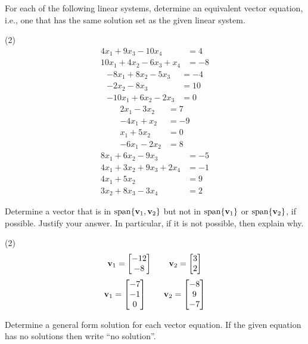 For each of the following linear systems, determine an equivalent
vector equation, i.e., one that has the same solution set as the given
linear system.
\begin{tasks}[resume, style=enumerate](2)
\task
  \begin{align*}4 x_{1} + 9 x_{3} - 10 x_{4} &= 4 \\10 x_{1} + 4 x_{2} - 6 x_{3} + x_{4} &= -8\end{align*}
\task
  \begin{align*}- 8 x_{1} + 8 x_{2} - 5 x_{3} &= -4 \\- 2 x_{2} - 8 x_{3} &= 10 \\- 10 x_{1} + 6 x_{2} - 2 x_{3} &= 0\end{align*}
\task
  \begin{align*}
    2x_{1} - 3x_{2} &= 7 \\
    -4x_{1} + x_{2} &= -9 \\
    x_{1} + 5x_{2} &= 0 \\
    -6x_{1} - 2x_{2} &= 8
  \end{align*}
\task
  \begin{align*}
    8x_{1} + 6x_{2} - 9x_{3} &= -5 \\
    4x_{1} + 3x_{2} + 9x_{3} + 2x_{4} &= -1 \\
    4x_{1} + 5x_{2} &= 9 \\
    3x_{2} + 8x_{3} - 3x_{4} &= 2
  \end{align*}
\end{tasks}
Determine a vector that is in $\operatorname{\mathrm{span}}\{\mathbf v_1, \mathbf v_2\}$ but not in
$\operatorname{\mathrm{span}}\{\mathbf v_1\}$ or $\operatorname{\mathrm{span}}\{\mathbf v_2\}$, if possible.  Justify your
answer.  In particular, if it is not possible, then explain why.
\begin{tasks}[resume, style=enumerate](2)
\task
  \begin{displaymath}
    \mathbf v_1 =  \begin{bmatrix} -12 \\ -8 \end{bmatrix} 
    \qquad
    \mathbf v_2 =  \begin{bmatrix} 3 \\ 2 \end{bmatrix} 
  \end{displaymath}
\task
  \begin{displaymath}
    \mathbf v_1 =  \begin{bmatrix} -7 \\ -1 \\ 0 \end{bmatrix} 
    \qquad
    \mathbf v_2 =  \begin{bmatrix} -8 \\ 9 \\ -7 \end{bmatrix} 
  \end{displaymath}
\end{tasks}
Determine a general form solution for each vector equation.  If the
given equation has no solutions then write \enquote{no solution}.
